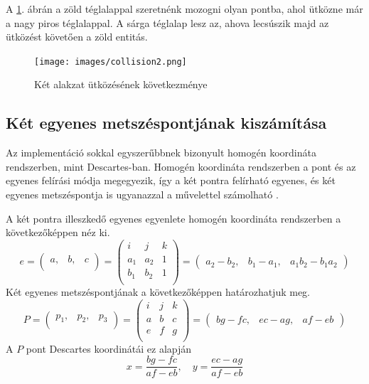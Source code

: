 A \ref{fig:collision2}. ábrán a zöld téglalappal szeretnénk mozogni olyan pontba, ahol ütközne már a nagy piros téglalappal. A sárga téglalap lesz az, ahova lecsúszik majd az ütközést követ\H oen a zöld entitás.

\begin{figure}[htb]
	\begin{center}
		\texttt{[image: images/collision2.png]}
		\caption{Két alakzat ütközésének következménye}
		\label{fig:collision2}
	\end{center}
\end{figure}

\subsection{Két egyenes metszéspontjának kiszámítása}

Az implementáció sokkal egyszerűbbnek bizonyult homogén koordináta rendszerben, mint Descartes-ban. Homogén koordináta rendszerben a pont és az egyenes felírási módja megegyezik, így a két pontra felírható egyenes, és két egyenes metszéspontja is ugyanazzal a művelettel számolható \cite{Banya5}.

A két pontra illeszkedő egyenes egyenlete homogén koordináta rendszerben a következőképpen néz ki.
$$
e = (
\begin{matrix}
a, & b, & c \\
\end{matrix}
) =
\left(
\begin{matrix}
i & j & k \\
a_1 & a_2 & 1 \\
b_1 & b_2 & 1 \\
\end{matrix}
\right) =
(
\begin{matrix}
a_2 - b_2, & b_1 - a_1, & a_1 b_2 - b_1 a_2
\end{matrix}
)
$$
Két egyenes metszéspontjának a következőképpen határozhatjuk meg.
$$
P = (
\begin{matrix}
p_1, & p_2, & p_3 \\
\end{matrix}
) =
\left(
\begin{matrix}
i & j & k \\
a & b & c \\
e & f & g \\
\end{matrix}
\right) =
(
\begin{matrix}
bg - fc, & ec - ag, & af - eb
\end{matrix}
)
$$
A $P$ pont Descartes koordinátái ez alapján
$$
x = \dfrac{bg - fc}{af - eb}, \quad
y = \dfrac{ec - ag}{af - eb}
$$

